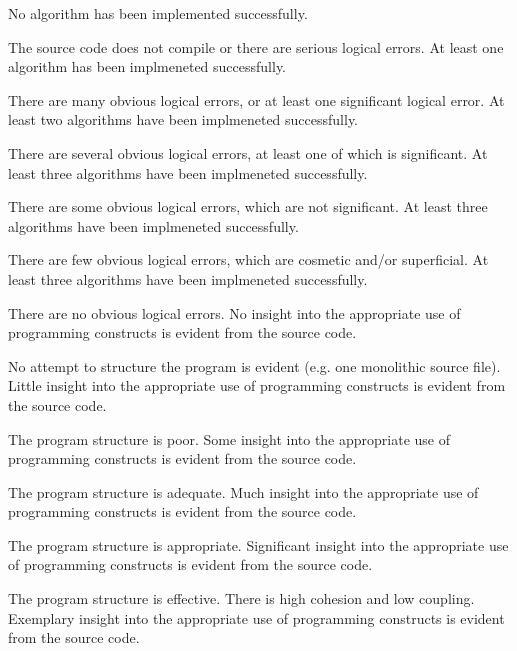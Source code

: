 \documentclass{../fal_assignment}
\begin{document}
\begin{markingrubric}
%
        \grade\fail 	No algorithm has been implemented successfully.
            \par 		The source code does not compile or there are serious logical errors.
        \grade 		At least one algorithm has been implmeneted successfully.
            \par 		There are many obvious logical errors, or at least one significant logical error.   
        \grade 		At least two algorithms have been implmeneted successfully.
            \par 		There are several obvious logical errors, at least one of which is significant. 
        \grade 		At least three algorithms have been implmeneted successfully.
            \par 		There are some obvious logical errors, which are not significant. 
        \grade 		At least three algorithms have been implmeneted successfully.
            \par 		There are few obvious logical errors, which are cosmetic and/or superficial.      
        \grade 		At least three algorithms have been implmeneted successfully.
            \par		There are no obvious logical errors.
%
        \grade\fail No insight into the appropriate use of programming constructs is evident from the source code.
            \par No attempt to structure the program is evident (e.g. one monolithic source file).
        \grade Little insight into the appropriate use of programming constructs is evident from the source code.
            \par The program structure is poor.
        \grade Some insight into the appropriate use of programming constructs is evident from the source code.
            \par The program structure is adequate.
        \grade Much insight into the appropriate use of programming constructs is evident from the source code.
            \par The program structure is appropriate.
        \grade Significant insight into the appropriate use of programming constructs is evident from the source code.
            \par The program structure is effective. There is high cohesion and low coupling.
        \grade Exemplary insight into the appropriate use of programming constructs is evident from the source code.

\end{markingrubric}
\end{document}
